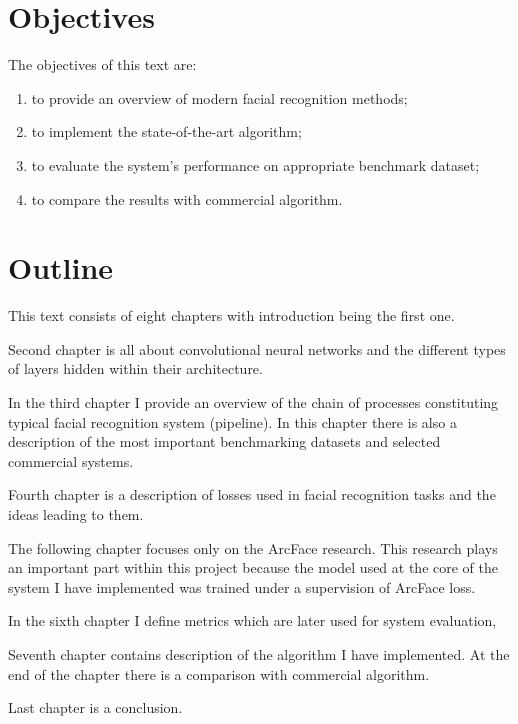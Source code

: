 \section{Objectives}\label{sec:objectives}
The objectives of this text are:
\begin{enumerate}
    \item to provide an overview of modern facial recognition methods;
    \item to implement the state-of-the-art algorithm;
    \item to evaluate the system's performance on appropriate benchmark dataset;
    \item to compare the results with commercial algorithm.
\end{enumerate}

\section{Outline}\label{sec:outline}
This text consists of eight chapters with introduction being the first one.

Second chapter is all about convolutional neural networks and the different types of layers hidden within their
architecture.

In the third chapter I provide an overview of the chain of processes constituting typical facial recognition system
(pipeline).
In this chapter there is also a description of the most important benchmarking datasets and selected commercial
systems.

Fourth chapter is a description of losses used in facial recognition tasks and the ideas leading to them.

The following chapter focuses only on the ArcFace research.
This research plays an important part within this project because the model used at the core of the system I have
implemented was trained under a supervision of ArcFace loss.

In the sixth chapter I define metrics which are later used for system evaluation,

Seventh chapter contains description of the algorithm I have implemented.
At the end of the chapter there is a comparison with commercial algorithm.

Last chapter is a conclusion.